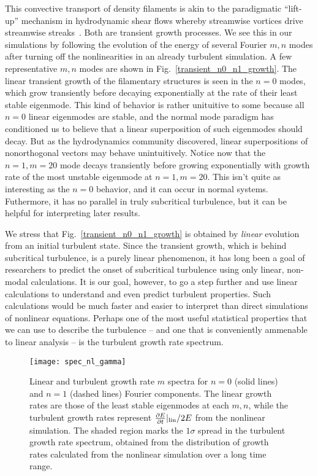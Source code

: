 \documentclass[letter,scriptaddress,twocolumn, prl,showkeys]{revtex4}
\newcommand{\pdiff}[2]{\frac{\partial#1}{\partial#2}}
\begin{document}
This convective transport of density filaments is akin to the paradigmatic ``lift-up'' mechanism in hydrodynamic shear flows whereby streamwise vortices drive streamwise streaks~\cite{krommes1999}.
Both are transient growth processes. We see this in our simulations by following the evolution of the energy of several Fourier $m,n$ modes after turning off the nonlinearities in an already
turbulent simulation. A few representative $m,n$ modes are shown in
Fig.~\ref{transient_n0_n1_growth}. The linear transient growth of the filamentary structures is seen in the $n=0$ modes, 
which grow transiently before decaying exponentially at the rate of their least stable eigenmode. This kind of behavior is rather unituitive to some because all $n=0$ linear eigenmodes are stable, 
and the normal mode paradigm has conditioned us to believe that a linear superposition of such eigenmodes should decay. But as the hydrodynamics community discovered, linear
superpositions of nonorthogonal vectors may behave unintuitively.
Notice now that the $n=1,m=20$ mode decays transiently before growing exponentially with growth rate of the most unstable eigenmode at $n=1,m=20$. This isn't quite as interesting as the $n=0$
behavior, and it can occur in normal systems. Futhermore, it has no parallel in truly subcritical turbulence, but it can be helpful for interpreting later results.

We stress that Fig.~\ref{transient_n0_n1_growth} is obtained by \emph{linear} evolution from an initial turbulent state.
Since the transient growth, which is behind subcritical turbulence, is a purely linear phenomenon, it has long been a goal of researchers to predict the onset of subcritical turbulence using
only linear, non-modal calculations. It is our goal, however, to go a step further and use linear calculations to understand and even predict turbulent properties.
Such calculations would be much faster and easier to interpret than direct simulations of nonlinear equations. Perhaps one of the most useful statistical properties that we can use to describe
the turbulence -- and one that is conveniently ammenable to linear analysis -- is the turbulent growth rate spectrum.

\begin{figure}
\centerline{\texttt{[image: spec\_nl\_gamma]}}
\caption{Linear and turbulent growth rate $m$ spectra for $n=0$ (solid lines) and $n=1$ (dashed lines) Fourier components. The linear growth rates are those of the least stable eigenmodes at each
$m,n$, while the turbulent growth rates represent $\pdiff{E}{t}|_{\rm{lin}}/2 E$ from the nonlinear simulation. The shaded region marks the $1 \sigma$ spread in the turbulent growth rate spectrum,
obtained from the distribution of growth rates calculated from the nonlinear simulation over a long time range.}
\label{spec_nl_gamma}
\end{figure}
\end{document}
